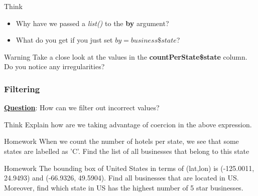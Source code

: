 \begin{DIY}{Think}
\noindent \begin{itemize}
  \item Why have we passed a \emph{list()} to the \textbf{by} argument? 
  \item What do you get if you just set $by = business\$state$?
\end{itemize}
\end{DIY}

\begin{DIY}{Warning}
\noindent Take a close look at the values in the \textbf{countPerState\$state} column. Do you notice any irregularities?
\end{DIY}

\newpage
\subsubsection{Filtering}
\noindent \textbf{\underline{Question}}: How can we filter out incorrect values? 
\begin{knitrout}
\color{fgcolor}\begin{kframe}
\begin{alltt}
\hlstd{(countPerState[}\hlstd{(}
                         \hlopt{$}
                         \hlstd{),}
                   \hlstd{]}
     \hlstd{)}
\end{alltt}
\end{kframe}
\end{knitrout}

\begin{DIY}{Think}
\noindent Explain how are we taking advantage of coercion in the above expression.
\end{DIY}

\begin{DIY}{Homework}
\noindent When we count the number of hotels per state, we see that some states are labelled as 'C'. Find the list of all businesses that belong to this state
\end{DIY}

\begin{DIY}{Homework}
\noindent The bounding box of United States in terms of (lat,lon) is (-125.0011, 24.9493) and (-66.9326, 49.5904). Find all
businesses that are located in US. Moreover, find which state in US has the highest number of 5 star businesses.
\end{DIY}

